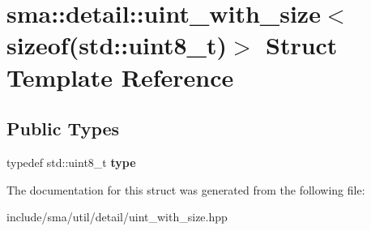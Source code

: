 \hypertarget{structsma_1_1detail_1_1uint__with__size_3_01sizeof_07std_1_1uint8__t_08_4}{\section{sma\-:\-:detail\-:\-:uint\-\_\-with\-\_\-size$<$ sizeof(std\-:\-:uint8\-\_\-t)$>$ Struct Template Reference}
\label{structsma_1_1detail_1_1uint__with__size_3_01sizeof_07std_1_1uint8__t_08_4}
}
\subsection*{Public Types}
\begin{DoxyCompactItemize}
\item 
\hypertarget{structsma_1_1detail_1_1uint__with__size_3_01sizeof_07std_1_1uint8__t_08_4_afbcd4289e7819533d81456caa6a3c5d5}{typedef std\-::uint8\-\_\-t {\bfseries type}}\label{structsma_1_1detail_1_1uint__with__size_3_01sizeof_07std_1_1uint8__t_08_4_afbcd4289e7819533d81456caa6a3c5d5}

\end{DoxyCompactItemize}


The documentation for this struct was generated from the following file\-:\begin{DoxyCompactItemize}
\item 
include/sma/util/detail/uint\-\_\-with\-\_\-size.\-hpp\end{DoxyCompactItemize}
